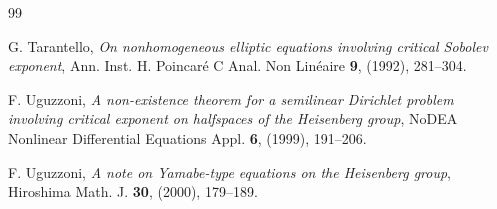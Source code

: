 \documentclass[11pt]{amsart}
\numberwithin{equation}{section} %
\theoremstyle{definition}
\begin{document}
\begin{thebibliography}{99}
	
	G. Tarantello, 
	{\em On nonhomogeneous elliptic equations involving critical Sobolev exponent}, 
	Ann. Inst. H. Poincar\'{e} C Anal. Non Lin\'{e}aire {\bf 9}, (1992), 281--304.
	
	F. Uguzzoni, 
	{\em A non-existence theorem for a semilinear Dirichlet problem involving critical exponent on halfspaces of the Heisenberg group}, 
	NoDEA Nonlinear Differential Equations Appl. {\bf 6}, (1999), 191--206.
	
	F. Uguzzoni, 
	{\em A note on Yamabe-type equations on the Heisenberg group}, Hiroshima Math. J. {\bf 30}, (2000), 179--189.
	
	
	
	
\end{thebibliography}


 
\end{document}
